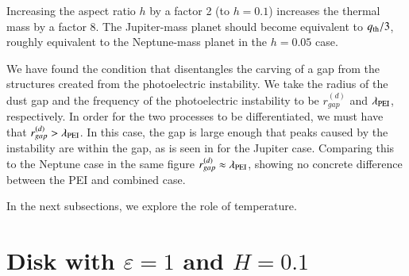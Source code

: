 \documentclass[onecolumn]{report}
\newcommand{\epsi}{\varepsilon}
\begin{document}
Increasing the aspect ratio $h$ by a factor 2 (to $h=0.1$) increases
the thermal mass by a factor 8. The Jupiter-mass planet
should become equivalent to $q_{\rm th}/3$, roughly equivalent to the
Neptune-mass planet in the $h=0.05$ case.

We have found the condition that disentangles the carving of a gap from the
structures created from the photoelectric instability.
We take the radius of the dust gap and the frequency of the photoelectric
instability to be $r_{gap}^{(d)}$ and $\lambda_{\rm PEI}$, respectively.
In order for the two processes to be differentiated, we must have that
$r_{gap}^{(d)} > \lambda_{\rm PEI}$. In this case, the gap is large enough
that peaks caused by the instability are within the gap, as is seen in
 for the Jupiter case. Comparing this to the
Neptune case in the same figure $r_{gap}^{(d)} \approx \lambda_{\rm PEI}$,
showing no concrete difference between the PEI and combined case.

In the next subsections, we explore the role of temperature.

\section{Disk with $\epsi=1$ and $H=0.1$}
\end{document}
